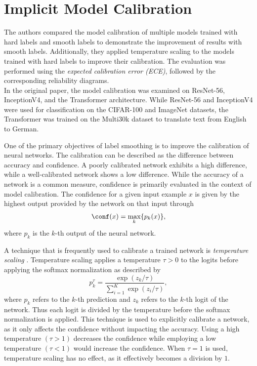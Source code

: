 \section{Implicit Model Calibration}\label{sec:imc}
\label{sec:model_calibration_basics}
The authors compared the model calibration of multiple models trained with hard labels and smooth labels to demonstrate the improvement of results with smooth labels. Additionally, they applied temperature scaling to the models trained with hard labels to improve their calibration. The evaluation was performed using the \textit{expected calibration error (ECE)}, followed by the corresponding reliability diagrams.\\

In the original paper, the model calibration was examined on ResNet-56, InceptionV4, and the Transformer architecture. While ResNet-56 and InceptionV4 were used for classification on the CIFAR-100 and ImageNet datasets, the Transformer was trained on the Multi30k dataset to translate text from English to German.

One of the primary objectives of label smoothing is to improve the calibration of neural networks. The calibration can be described as the difference between accuracy and confidence. A poorly calibrated network exhibits a high difference, while a well-calibrated network shows a low difference. While the accuracy of a network is a common measure, confidence is primarily evaluated in the context of model calibration. The confidence for a given input example $x$ is given by the highest output provided by the network on that input through
$$\conf(x) = \max_k\{p_k(x)\},$$
where $p_k$ is the $k$-th output of the neural network.

A technique that is frequently used to calibrate a trained network is \textit{temperature scaling} \cite{Guo2017}. Temperature scaling applies a temperature $\tau>0$ to the logits before applying the softmax normalization as described by
$$p_k^{\tau} = \frac{\exp(z_k/\tau)}{\sum_{i=1}^K \exp(z_i/\tau)},$$
where $p_k$ refers to the $k$-th prediction and $z_k$ refers to the $k$-th logit of the network. Thus each logit is divided by the temperature before the softmax normalization is applied. This technique is used to explicitly calibrate a network, as it only affects the confidence without impacting the accuracy. Using a high temperature $(\tau > 1)$ decreases the confidence while employing a low temperature $(\tau < 1)$ would increase the confidence. When $\tau=1$ is used, temperature scaling has no effect, as it effectively becomes a division by $1$.\\

